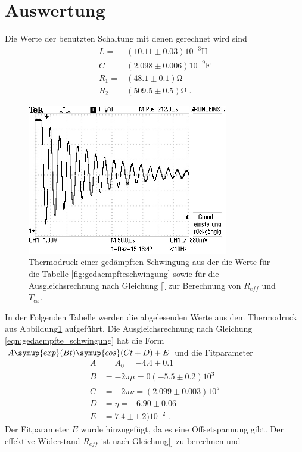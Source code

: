 \section{Auswertung}
\label{sec:Auswertung}
Die Werte der benutzten Schaltung mit denen gerechnet wird sind
\begin{align*}
  L=&(10.11\pm0.03)10^{-3}\si{\henry}\\
  C=&(2.098\pm0.006)10^{-9}\si{\farad}\\
  R_1=&(48.1\pm0.1)\si{\ohm}\\
  R_2=&(509.5\pm0.5)\si{\ohm}\;.
\end{align*}
\begin{figure}
  \centering
  \includegraphics[width=0.78\textwidth]{Thermodruck.JPG}
  \caption{Thermodruck einer gedämpften Schwingung aus der die Werte für
  die Tabelle \ref{fig:gedaempfteschwingung} sowie für die Ausgleichsrechnung
  nach Gleichung \eqref{} zur Berechnung von $R_{eff}$ und $T_{ex}$.}
  \label{fig:termodruck}
\end{figure}
In der Folgenden Tabelle werden die abgelesenden Werte aus dem Thermodruck
aus Abbildung\ref{fig:termodruck} aufgeführt. Die Ausgleichsrechnung nach Gleichung
\eqref{eqn:gedaempfte_schwingung} hat die Form $A\symup{exp}(Bt)\symup{cos}(Ct+D)+E$
und die Fitparameter
\begin{align*}
  A&=A_0=-4.4\pm0.1  \\
  B&=-2\pi\mu=0(-5.5\pm0.2)10^3  \\
  C&=-2\pi\nu=(2.099\pm0.003)10^5   \\
  D&=\eta=-6.90\pm0.06  \\
  E&=7.4\pm1.2)10^{-2}\;.
\end{align*}
Der Fitparameter $E$ wurde hinzugefügt, da es eine Offsetspannung gibt.
Der effektive Widerstand $R_{eff}$ ist nach Gleichung\eqref{} zu berechnen und
